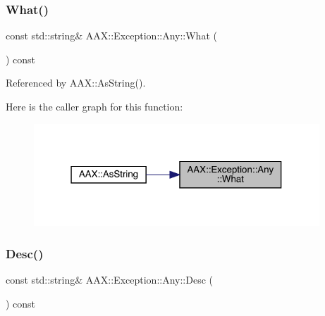 \mbox{\label{a01593_a3ceff81ddcd5c9694d1f3e0f01616563}} 
\subsubsection{\texorpdfstring{What()}{What()}}
{\footnotesize\ttfamily const std\+::string\& A\+A\+X\+::\+Exception\+::\+Any\+::\+What (\begin{DoxyParamCaption}{ }\end{DoxyParamCaption}) const\hspace{0.3cm}{\ttfamily [inline]}}



Referenced by A\+A\+X\+::\+As\+String().

Here is the caller graph for this function\+:
\nopagebreak
\begin{figure}[H]
\begin{center}
\leavevmode
\includegraphics[width=304pt]{a01593_a3ceff81ddcd5c9694d1f3e0f01616563_icgraph}
\end{center}
\end{figure}
\mbox{\label{a01593_a7ce275788cf887eb3f668f0c5de970d0}} 
\subsubsection{\texorpdfstring{Desc()}{Desc()}}
{\footnotesize\ttfamily const std\+::string\& A\+A\+X\+::\+Exception\+::\+Any\+::\+Desc (\begin{DoxyParamCaption}{ }\end{DoxyParamCaption}) const\hspace{0.3cm}{\ttfamily [inline]}}

\mbox{\label{a01593_a0fb60f64c722aedd6fb90d8c38f66c8a}} 
